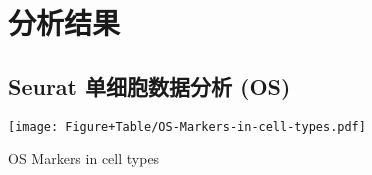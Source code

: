 \documentclass[
]{article}
\begin{document}
\hypertarget{workflow}{%
\section{分析结果}\label{workflow}}

\hypertarget{seurat-ux5355ux7ec6ux80deux6570ux636eux5206ux6790-os}{%
\subsection{Seurat 单细胞数据分析 (OS)}\label{seurat-ux5355ux7ec6ux80deux6570ux636eux5206ux6790-os}}

\begin{center}\vspace{1.5cm}\end{center}
\def\@captype{figure}
\begin{center}
\texttt{[image: Figure+Table/OS-Markers-in-cell-types.pdf]}
\caption{OS Markers in cell types}\label{fig:OS-Markers-in-cell-types}
\end{center}
\end{document}

